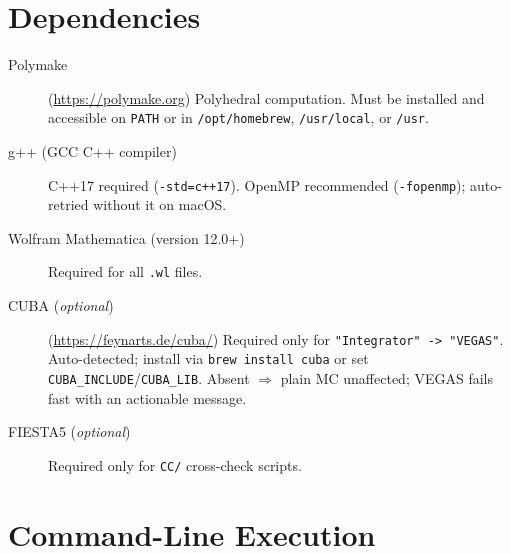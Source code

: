 \documentclass[11pt,a4paper]{article}
\begin{document}
\section{Dependencies}

\begin{description}
  \item[Polymake] (\url{https://polymake.org}) Polyhedral computation. Must be installed and accessible on \texttt{PATH} or in \texttt{/opt/homebrew}, \texttt{/usr/local}, or \texttt{/usr}.
  \item[g++ (GCC C++ compiler)] C++17 required (\texttt{-std=c++17}). OpenMP recommended (\texttt{-fopenmp}); auto-retried without it on macOS.
  \item[Wolfram Mathematica (version 12.0+)] Required for all \texttt{.wl} files.
  \item[CUBA (\emph{optional})] (\url{https://feynarts.de/cuba/}) Required only for \texttt{"Integrator" -> "VEGAS"}. Auto-detected; install via \texttt{brew install cuba} or set \texttt{CUBA\_INCLUDE}/\texttt{CUBA\_LIB}. Absent $\Rightarrow$ plain MC unaffected; VEGAS fails fast with an actionable message.
  \item[FIESTA5 (\emph{optional})] Required only for \texttt{CC/} cross-check scripts.
\end{description}

\section{Command-Line Execution}
\end{document}
